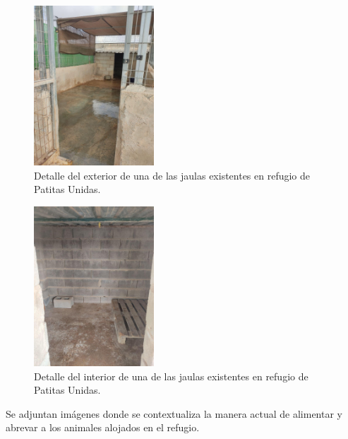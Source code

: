\documentclass[12pt]{article}
\begin{document}
	
	\begin{figure}[h!]
		\begin{center}
			\includegraphics[width=0.4\textwidth]{img/refugio_jaulas_detalleExterior.jpg}
			\caption{Detalle del exterior de una de las jaulas existentes en refugio de Patitas Unidas.}
			\label{Foto jaulas refugio detalle exterior}
		\end{center}
	\end{figure}
	
	\pagebreak
	
	\begin{figure}[h!]
		\begin{center}
			\includegraphics[width=0.4\textwidth]{img/refugio_jaulas_detalleInterior.jpg}
			\caption{Detalle del interior de una de las jaulas existentes en refugio de Patitas Unidas.}
			\label{Foto jaulas refugio detalle interior}
		\end{center}
	\end{figure}

	\noindent Se adjuntan imágenes donde se contextualiza la manera actual de alimentar y abrevar a los animales alojados en el refugio. \\
	
\end{document}
